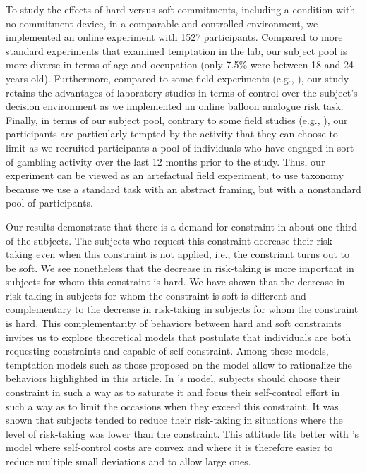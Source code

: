 \documentclass[
]{book}
\begin{document}
To study the effects of hard versus soft commitments, including a condition with
no commitment device, in a comparable and controlled environment, we implemented
an online experiment with 1527 participants.
Compared to more standard experiments that examined temptation in the lab, our
subject pool is more diverse in terms of age and occupation (only 7.5\% were
between 18 and 24 years old).
Furthermore, compared to some field experiments (e.g., \citet{ashraf2006tying}), our
study retains the advantages of laboratory studies in terms of control over the
subject's decision environment as we implemented an online balloon analogue risk
task.
Finally, in terms of our subject pool, contrary to some field studies (e.g.,
\citet{milkman2014holding}), our participants are particularly tempted by the activity
that they can choose to limit as we recruited participants a pool of individuals
who have engaged in sort of gambling activity over the last 12 months prior to
the study.
Thus, our experiment can be viewed as an artefactual field experiment, to use
\citet{harrison2004field} taxonomy because we use a standard task with an abstract
framing, but with a nonstandard pool of participants.

Our results demonstrate that there is a demand for constraint in about one third
of the subjects.
The subjects who request this constraint decrease their risk-taking even when
this constraint is not applied, i.e., the constriant turns out to be soft.
We see nonetheless that the decrease in risk-taking is more important in
subjects for whom this constraint is hard.
We have shown that the decrease in risk-taking in subjects for whom the
constraint is soft is different and complementary to the decrease in
risk-taking in subjects for whom the constraint is hard.
This complementarity of behaviors between hard and soft constraints
invites us to explore theoretical models that postulate that individuals are
both requesting constraints and capable of self-constraint.
Among these models, temptation models such as those proposed on the
\citet{gul2001temptation} model allow to rationalize the behaviors highlighted in
this article.
In \citet{gul2001temptation}'s model, subjects should choose their constraint in such a
way as to saturate it and focus their self-control effort in such a way as to
limit the occasions when they exceed this constraint.
It was shown that subjects tended to reduce their risk-taking in situations
where the level of risk-taking was lower than the constraint.
This attitude fits better with \citet{noor2015menu}'s model where self-control costs
are convex and where it is therefore easier to reduce multiple small deviations
and to allow large ones.
\end{document}
